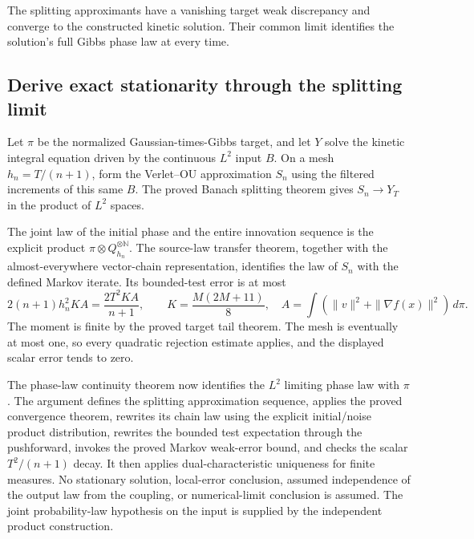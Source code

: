 \documentclass[11pt,a4paper]{report}
\begin{document}
The splitting approximants have a vanishing target weak discrepancy and converge to the constructed kinetic solution. Their common limit identifies the solution’s full Gibbs phase law at every time.

\subsection{\texorpdfstring{Derive exact stationarity through the splitting limit}{Derive exact stationarity through the splitting limit}}
\label{report-step-KineticLangevin-StationarityTransfer-lean-1}


Let \(\pi\) be the normalized Gaussian-times-Gibbs target, and let \(Y\) solve the kinetic integral equation driven by the continuous \(L^{2}\) input \(B\). On a mesh \(h_n=T/(n+1)\), form the Verlet–OU approximation \(S_n\) using the filtered increments of this same \(B\). The proved Banach splitting theorem gives \(S_n\to Y_T\) in the product of \(L^{2}\) spaces.



The joint law of the initial phase and the entire innovation sequence is the explicit product \(\pi\otimes Q_{h_n}^{\otimes\mathbb N}\). The source-law transfer theorem, together with the almost-everywhere vector-chain representation, identifies the law of \(S_n\) with the defined Markov iterate. Its bounded-test error is at most \[2(n+1)h_n^2 K A=\frac{2T^2KA}{n+1},\qquad K=\frac{M(2M+11)}8,\quad A=\int(\|v\|^2+\|\nabla f(x)\|^2)\,d\pi.\] The moment is finite by the proved target tail theorem. The mesh is eventually at most one, so every quadratic rejection estimate applies, and the displayed scalar error tends to zero.



The phase-law continuity theorem now identifies the \(L^{2}\) limiting phase law with \(\pi\). The argument defines the splitting approximation sequence, applies the proved convergence theorem, rewrites its chain law using the explicit initial/\allowbreak{}noise product distribution, rewrites the bounded test expectation through the pushforward, invokes the proved Markov weak-error bound, and checks the scalar \(T^2/(n+1)\) decay. It then applies dual-characteristic uniqueness for finite measures. No stationary solution, local-error conclusion, assumed independence of the output law from the coupling, or numerical-limit conclusion is assumed. The joint probability-law hypothesis on the input is supplied by the independent product construction.
\end{document}

